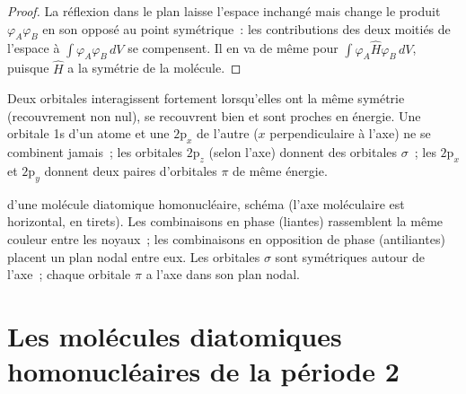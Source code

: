 \begin{proof}
La réflexion dans le plan laisse l'espace inchangé mais change le produit
$\varphi_A\varphi_B$ en son opposé au point symétrique~: les contributions des
deux moitiés de l'espace à $\int\varphi_A\varphi_B\,dV$ se compensent. Il en va de même pour
$\int\varphi_A\hat H\varphi_B\,dV$, puisque $\hat H$ a la symétrie de la molécule.
\end{proof}

Deux orbitales interagissent fortement lorsqu'elles ont la même symétrie (recouvrement
non nul), se recouvrent bien et sont proches en énergie. Une orbitale 1s d'un atome et une
$2\mathrm p_x$ de l'autre ($x$ perpendiculaire à l'axe) ne se combinent jamais~;
les orbitales $2\mathrm p_z$ (selon l'axe) donnent des orbitales $\sigma$~; les $2\mathrm p_x$ et
$2\mathrm p_y$ donnent deux paires d'orbitales $\pi$ de même énergie.

\begin{omfigure}

{\small {} d'une molécule diatomique homonucléaire, schéma (l'axe
moléculaire est horizontal, en tirets). Les combinaisons en phase (liantes) rassemblent la
même couleur entre les noyaux~; les combinaisons en opposition de phase (antiliantes) placent un
plan nodal entre eux. Les orbitales $\sigma$ sont symétriques autour de l'axe~; chaque orbitale $\pi$
a l'axe dans son plan nodal.}
\end{omfigure}

\section{Les molécules diatomiques homonucléaires de la période 2}

